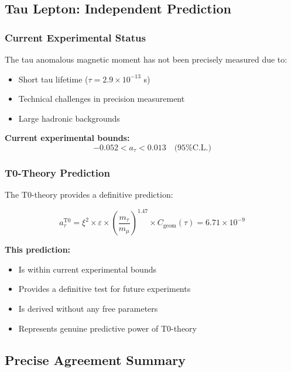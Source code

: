 \documentclass[12pt,a4paper]{article}
\numberwithin{equation}{section}
\newcommand{\xipar}{\xi}
\newcommand{\epsilonT}{\varepsilon}
\newcommand{\Cgeom}{C_{\text{geom}}}
\begin{document}
	\subsection{Tau Lepton: Independent Prediction}
	
	\subsubsection{Current Experimental Status}
	
	The tau anomalous magnetic moment has not been precisely measured due to:
	\begin{itemize}
		\item Short tau lifetime ($\tau = 2.9 \times 10^{-13}$ s)
		\item Technical challenges in precision measurement
		\item Large hadronic backgrounds
	\end{itemize}
	
	\textbf{Current experimental bounds:}
	\begin{equation}
		-0.052 < a_\tau < 0.013 \quad \text{(95\% C.L.)}
		\label{eq:tau_experimental_bounds}
	\end{equation}
	
	\subsubsection{T0-Theory Prediction}
	
	The T0-theory provides a definitive prediction:
	
	\begin{equation}
		a_\tau^{\text{T0}} = \xipar^2 \times \epsilonT \times \left(\frac{m_\tau}{m_\mu}\right)^{1.47} \times \Cgeom(\tau) = 6.71 \times 10^{-9}
		\label{eq:tau_t0_prediction}
	\end{equation}
	
	\textbf{This prediction:}
	\begin{itemize}
		\item Is within current experimental bounds
		\item Provides a definitive test for future experiments
		\item Is derived without any free parameters
		\item Represents genuine predictive power of T0-theory
	\end{itemize}
	
	
	\subsection{Precise Agreement Summary}
	
\end{document}
